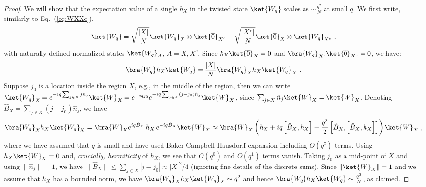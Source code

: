 \documentclass[prx,letterpaper,aps,superscriptaddress,floatfix,twocolumn,nofootinbib]{revtex4-2}
\theoremstyle{definition}
\newcommand{\ktO}{\ket{\overline{0}}}
\begin{document}
\begin{proof}
We will show that the expectation value of a single $h_X$ in the twisted state $\ket{W_q}$ scales as $\sim \frac{q^2}{N}$ at small $q$.
%
We first write, similarly to Eq.~(\ref{eq:WXXc}),
\begin{equation}
\ket{W_q} = \sqrt{\frac{|X|}{N}} \ket{W_q}_X \otimes \ktO_{X^c} + \sqrt{\frac{|X^c|}{N}} \ktO_X \otimes \ket{W_q}_{X^c} ~,
\end{equation}
with naturally defined normalized states $\ket{W_q}_A$, $A = X, X^c$.
%
Since $h_X \ktO_X = 0$ and $\bra{W_q}_{X^c} \ket{\bar{0}}_{X^c} = 0$, we have:
\begin{equation}
\bra{W_q} h_X \ket{W_q} = \frac{|X|}{N} \bra{W_q}_X h_X \ket{W_q}_X ~.
\end{equation}
%
Suppose $j_0$ is a location inside the region $X$, e.g., in the middle of the region, then we can write $\ket{W_q}_X = e^{-i q \sum_{j \in X} j \hat{n}_j} \ket{W}_X = e^{-i q j_0} e^{-i q \sum_{j \in X} (j-j_0) \hat{n}_j} \ket{W}_X$, since $\sum_{j \in X} \hat{n}_j \ket{W}_X = \ket{W}_X$.
%
Denoting $\hat{B}_X = \sum_{j \in X} (j-j_0) \hat{n}_j$, we have
\begin{equation}
\begin{aligned}
\bra{W_q}_X h_X \ket{W_q}_X
= \bra{W}_X e^{i q \hat{B}_X} \, h_X \, e^{-i q \hat{B}_X} \ket{W}_X \approx \bra{W}_X \left( h_X + i q \left[ \hat{B}_X, h_X \right] - \frac{q^2}{2} \left[ \hat{B}_X, \left[ \hat{B}_X, h_X \right] \right] \right) \ket{W}_X ~,
\end{aligned}
\label{eq:Wq_hX_Wq_expand}
\end{equation}
where we have assumed that $q$ is small and have used Baker-Campbell-Hausdorff expansion including $O(q^2)$ terms.
%
Using $h_X \ket{W}_X = 0$ and, {\it crucially, hermiticity} of $h_X$, we see that $O(q^0)$ and $O(q^1)$ terms vanish.
%
Taking $j_0$ as a mid-point of $X$ and using $\|\hat{n}_j\| = 1$, we have $\| \hat{B}_X \| \leq \sum_{j \in X} |j-j_0| \approx |X|^2/4$ (ignoring fine details of the discrete sums).
%
Since $\| \ket{W}_X \| = 1$ and we assume that $h_X$ has a bounded norm, we have $\bra{W_q}_X h_X \ket{W_q}_X \sim q^2$ and hence $\bra{W_q} h_X \ket{W_q} \sim \frac{q^2}{N}$, as claimed.
%


\end{proof}
\end{document}
